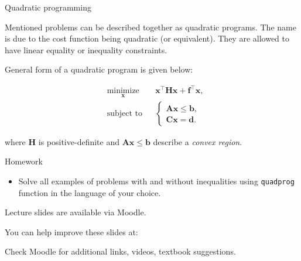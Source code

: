 \documentclass{beamer}
\begin{document}
\begin{frame}{Quadratic programming}
\begin{flushleft}

Mentioned problems can be described together as quadratic programs. The name is due to the cost function being quadratic (or equivalent). They are allowed to have linear equality or inequality constraints. 

\bigskip

General form of a quadratic program is given below:

%
\begin{equation}
\begin{aligned}
& \underset{\mathbf{x}}{\text{minimize}}
& & \mathbf{x}^\top \mathbf{H} \mathbf{x} + \mathbf{f}^\top\mathbf{x}, \\
& \text{subject to}
& & \begin{cases}
    \mathbf{A}\mathbf{x} \leq \mathbf{b}, \\
    \mathbf{C}\mathbf{x} = \mathbf{d}.
    \end{cases}
\end{aligned}
\end{equation}

where $\mathbf{H}$ is positive-definite and $\mathbf{A}\mathbf{x} \leq \mathbf{b}$ describe a \emph{convex region}.

\end{flushleft}
\end{frame}



\begin{frame}{Homework}
\begin{flushleft}

\begin{itemize}
    \item Solve all examples of problems with and without inequalities using \texttt{quadprog} function in the language of your choice.
\end{itemize}

\end{flushleft}
\end{frame}





\begin{frame}
	\centerline{Lecture slides are available via Moodle.}
	\bigskip
	\centerline{You can help improve these slides at:}
	\centerline{
		\mygit
	}
	\bigskip
	
	\textcolor{black}{}
	\bigskip
	
	
	\centerline{Check Moodle for additional links, videos, textbook suggestions.}
\end{frame}
\end{document}
